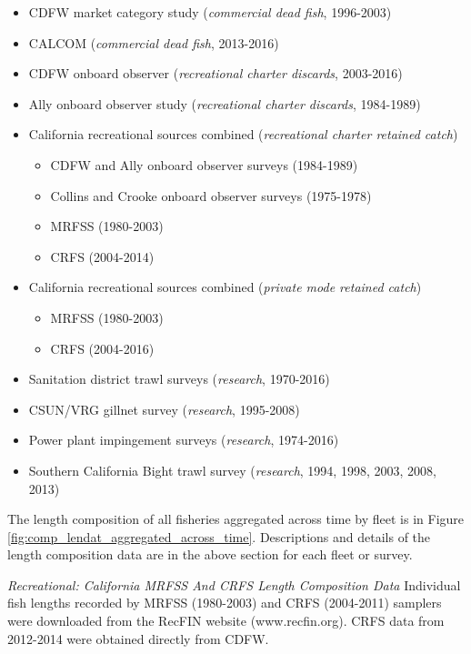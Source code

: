 \documentclass[12pt,]{article}
\begin{document}
\begin{itemize}[noitemsep,nolistsep,topsep=0pt]
  \item CDFW market category study (\emph{commercial dead fish}, 1996-2003)    
  \item CALCOM (\emph{commercial dead fish}, 2013-2016)    
  \item CDFW onboard observer (\emph{recreational charter discards}, 2003-2016)    
  \item Ally onboard observer study (\emph{recreational charter discards}, 1984-1989)  
  \item California recreational sources combined (\emph{recreational charter retained catch})     
    \begin{itemize}[noitemsep,nolistsep]
      \item CDFW and Ally onboard observer surveys (1984-1989)     
      \item Collins and Crooke onboard observer surveys (1975-1978)     
      \item MRFSS (1980-2003)     
      \item CRFS (2004-2014)
    \end{itemize}
 \item California recreational sources combined (\emph{private mode retained catch})      
    \begin{itemize}[noitemsep,nolistsep]   
      \item MRFSS (1980-2003)      
      \item CRFS (2004-2016)  
    \end{itemize}
 \item Sanitation district trawl surveys (\emph{research}, 1970-2016)      
 \item CSUN/VRG gillnet survey (\emph{research}, 1995-2008)        
 \item Power plant impingement surveys (\emph{research}, 1974-2016)  
 \item Southern California Bight trawl survey (\emph{research}, 1994, 1998, 2003, 2008, 2013) 
\end{itemize}

The length composition of all fisheries aggregated across time by fleet
is in Figure \ref{fig:comp_lendat_aggregated_across_time}. Descriptions
and details of the length composition data are in the above section for
each fleet or survey.

\emph{Recreational: California MRFSS And CRFS Length Composition Data}
Individual fish lengths recorded by MRFSS (1980-2003) and CRFS
(2004-2011) samplers were downloaded from the RecFIN website
(www.recfin.org). CRFS data from 2012-2014 were obtained directly from
CDFW.
\end{document}
